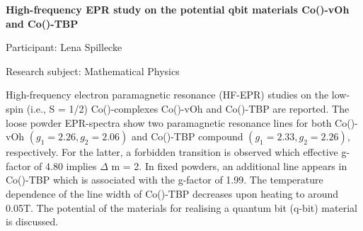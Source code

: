 \hfill 

\begin{minipage}[t]{1.0\textwidth}

\begin{center}

{{\large\bfseries High-frequency EPR study on the potential qbit materials Co()-vOh and Co()-TBP}\par}

\end{center}

{\noindent Participant: Lena Spillecke\par} 

{\noindent Research subject: Mathematical Physics\par}\medskip

\noindent High-frequency electron paramagnetic resonance (HF-EPR) studies on the low-spin (i.e., S = 1/2) Co()-complexes Co()-vOh and Co()-TBP are reported. The loose powder EPR-spectra show two paramagnetic resonance lines for both Co()-vOh $(g_{1} = 2.26, g_{2} = 2.06)$ and Co()-TBP compound $(g_{1} = 2.33, g_{2} = 2.26)$, respectively. For the latter, a forbidden transition is observed which effective g-factor of  4.80 implies $\Delta$ m = 2. In fixed powders, an additional line appears in Co()-TBP which is associated with the g-factor of 1.99. The temperature dependence of the line width of Co()-TBP decreases upon heating to around 0.05T. The potential of the materials for realising a quantum bit (q-bit) material is discussed. \par\end{minipage}

\hfill 

